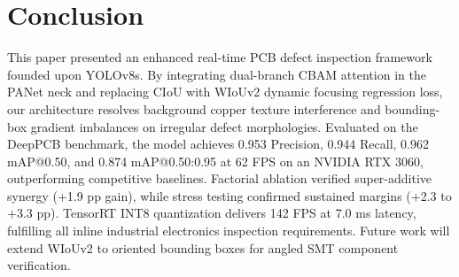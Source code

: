 \documentclass{llncs}
\begin{document}
\section{Conclusion}
This paper presented an enhanced real-time PCB defect inspection framework founded upon YOLOv8s. By integrating dual-branch CBAM attention in the PANet neck and replacing CIoU with WIoUv2 dynamic focusing regression loss, our architecture resolves background copper texture interference and bounding-box gradient imbalances on irregular defect morphologies. Evaluated on the DeepPCB benchmark, the model achieves 0.953 Precision, 0.944 Recall, 0.962 mAP@0.50, and 0.874 mAP@0.50:0.95 at 62 FPS on an NVIDIA RTX 3060, outperforming competitive baselines. Factorial ablation verified super-additive synergy (+1.9 pp gain), while stress testing confirmed sustained margins (+2.3 to +3.3 pp). TensorRT INT8 quantization delivers 142 FPS at 7.0 ms latency, fulfilling all inline industrial electronics inspection requirements. Future work will extend WIoUv2 to oriented bounding boxes for angled SMT component verification.



\end{document}
